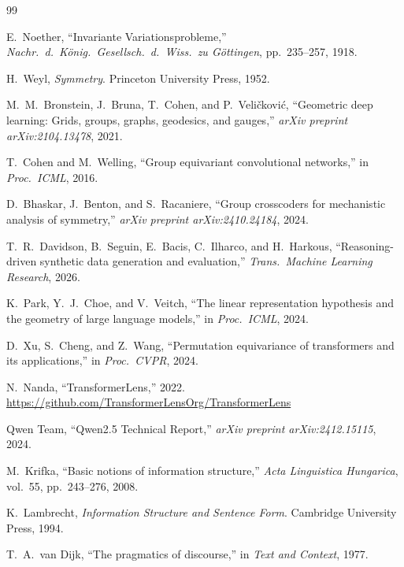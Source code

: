 \documentclass[10pt, letterpaper]{article}
\begin{document}
\begin{thebibliography}{99}

E.~Noether, ``Invariante Variationsprobleme,'' \textit{Nachr.\ d.\ K\"onig.\ Gesellsch.\ d.\ Wiss.\ zu G\"ottingen}, pp.~235--257, 1918.

H.~Weyl, \textit{Symmetry}. Princeton University Press, 1952.

M.~M.~Bronstein, J.~Bruna, T.~Cohen, and P.~Veli\v{c}kovi\'{c}, ``Geometric deep learning: Grids, groups, graphs, geodesics, and gauges,'' \textit{arXiv preprint arXiv:2104.13478}, 2021.

T.~Cohen and M.~Welling, ``Group equivariant convolutional networks,'' in \textit{Proc.\ ICML}, 2016.

D.~Bhaskar, J.~Benton, and S.~Racaniere, ``Group crosscoders for mechanistic analysis of symmetry,'' \textit{arXiv preprint arXiv:2410.24184}, 2024.

T.~R.~Davidson, B.~Seguin, E.~Bacis, C.~Ilharco, and H.~Harkous, ``Reasoning-driven synthetic data generation and evaluation,'' \textit{Trans.\ Machine Learning Research}, 2026.

K.~Park, Y.~J.~Choe, and V.~Veitch, ``The linear representation hypothesis and the geometry of large language models,'' in \textit{Proc.\ ICML}, 2024.

D.~Xu, S.~Cheng, and Z.~Wang, ``Permutation equivariance of transformers and its applications,'' in \textit{Proc.\ CVPR}, 2024.

N.~Nanda, ``TransformerLens,'' 2022. \url{https://github.com/TransformerLensOrg/TransformerLens}

Qwen Team, ``Qwen2.5 Technical Report,'' \textit{arXiv preprint arXiv:2412.15115}, 2024.

M.~Krifka, ``Basic notions of information structure,'' \textit{Acta Linguistica Hungarica}, vol.~55, pp.~243--276, 2008.

K.~Lambrecht, \textit{Information Structure and Sentence Form}. Cambridge University Press, 1994.

T.~A.~van Dijk, ``The pragmatics of discourse,'' in \textit{Text and Context}, 1977.

\end{thebibliography}
\end{document}
